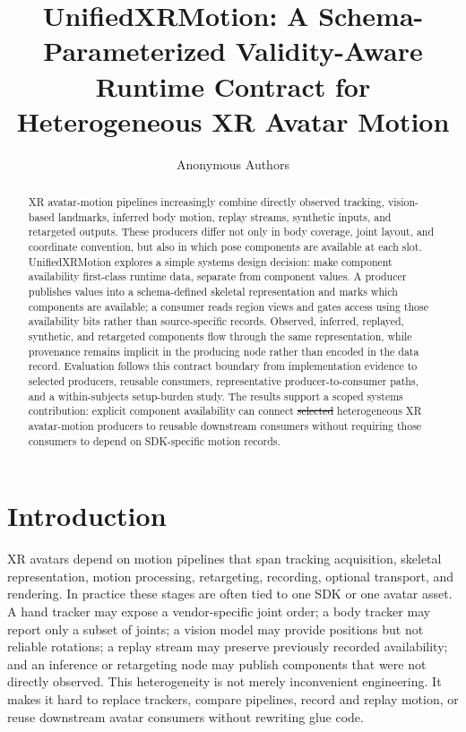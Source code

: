 \documentclass[runningheads]{llncs}
\newcommand{\rdel}[1]{\textcolor{revdel}{\sout{#1}}}
\newcommand{\rdel}[1]{}
\begin{document}
\title{UnifiedXRMotion: A Schema-Parameterized Validity-Aware Runtime Contract for Heterogeneous XR Avatar Motion}
\author{Anonymous Authors}
\maketitle

\begin{abstract}
	XR avatar-motion pipelines increasingly combine directly observed tracking, vision-based landmarks, inferred body motion, replay streams, synthetic inputs, and retargeted outputs. These producers differ not only in body coverage, joint layout, and coordinate convention, but also in which pose components are available at each slot. UnifiedXRMotion explores a simple systems design decision: make component availability first-class runtime data, separate from component values. A producer publishes values into a schema-defined skeletal representation and marks which components are available; a consumer reads region views and gates access using those availability bits rather than source-specific records. Observed, inferred, replayed, synthetic, and retargeted components flow through the same representation, while provenance remains implicit in the producing node rather than encoded in the data record. Evaluation follows this contract boundary from implementation evidence to selected producers, reusable consumers, representative producer-to-consumer paths, and a within-subjects setup-burden study. The results support a scoped systems contribution: explicit component availability can connect \rdel{selected }heterogeneous XR avatar-motion producers to reusable downstream consumers without requiring those consumers to depend on SDK-specific motion records.
\end{abstract}

\section{Introduction}\label{sec:introduction}
XR avatars depend on motion pipelines that span tracking acquisition, skeletal representation, motion processing, retargeting, recording, optional transport, and rendering. In practice these stages are often tied to one SDK or one avatar asset. A hand tracker may expose a vendor-specific joint order; a body tracker may report only a subset of joints; a vision model may provide positions but not reliable rotations; a replay stream may preserve previously recorded availability; and an inference or retargeting node may publish components that were not directly observed. This heterogeneity is not merely inconvenient engineering. It makes it hard to replace trackers, compare pipelines, record and replay motion, or reuse downstream avatar consumers without rewriting glue code.
\end{document}
